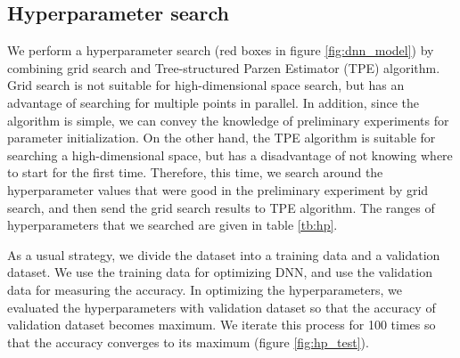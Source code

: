 \documentclass[proof]{pasj01}
\begin{document}
\subsection{Hyperparameter search}\label{hyperparametersearch}
We perform a hyperparameter search (red boxes in figure \ref{fig:dnn_model}) by combining grid search and Tree-structured Parzen Estimator (TPE) algorithm.
Grid search is not suitable for high-dimensional space search, but has an advantage of searching for multiple points in parallel.
In addition, since the algorithm is simple, we can convey the knowledge of preliminary experiments for parameter initialization.
On the other hand, the TPE algorithm is suitable for searching a high-dimensional space, but has a disadvantage of not knowing where to start for the first time.
Therefore, this time, we search around the hyperparameter values that were good in the preliminary experiment by grid search, and then send the grid search results to TPE algorithm.  
The ranges of hyperparameters that we searched are given in table \ref{tb:hp}.

As a usual strategy, we divide the dataset into a training data and a validation dataset.
We use the training data for optimizing DNN, and use the validation data for measuring the accuracy.
In optimizing the hyperparameters, we evaluated the hyperparameters with validation dataset so
that the accuracy of validation dataset becomes maximum.
We iterate this process for 100 times so that the accuracy converges to its maximum (figure \ref{fig:hp_test}).

%
\begin{table}[htbp]
  \label{tb:hp}
\end{table}
\end{document}
